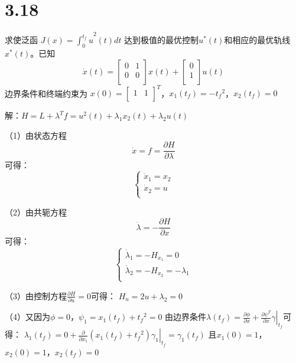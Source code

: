 \documentclass[UTF8]{ctexart}
\begin{document}
\section{3.18}
求使泛函
$J(x)={{\int_{0}^{{{t}_{f}}}{u}}^{2}}\left( t \right)dt$
达到极值的最优控制${{u}^{*}}(t)$和相应的最优轨线${{x}^{*}}(t)$。已知
\[\dot{x}\left( t \right)=\left[ \begin{matrix}
   0 & 1  \\
   0 & 0  \\
\end{matrix} \right]x\left( t \right)+\left[ \begin{matrix}
   0  \\
   1  \\
\end{matrix} \right]u\left( t \right)\]
边界条件和终端约束为
$x\left( 0 \right)={{\left[ \begin{matrix}
   1 & 1  \\
\end{matrix} \right]}^{T}}$，${{x}_{1}}\left( {{t}_{f}} \right)=-{{t}_{f}}^{2}$，${{x}_{2}}\left( {{t}_{f}} \right)=0$

	解：$H=L+{{\lambda }^{T}}f={{u}^{2}}\left( t \right)+{{\lambda }_{1}}x{}_{2}\left( t \right)+{{\lambda }_{2}}u\left( t \right)$

	（1）由状态方程\[\dot{x}=f=\frac{\partial H}{\partial \lambda }\]可得： 
\[\left\{ \begin{array}{*{35}{l}}
   {{{\dot{x}}}_{1}}={{x}_{2}}  \\
   {{{\dot{x}}}_{2}}=u  \\
\end{array} \right.\]

（2）由共轭方程\[\dot{\lambda }=-\frac{\partial H}{\partial x}\]可得：
\[\left\{ \begin{array}{*{35}{l}}
   {{{\dot{\lambda }}}_{1}}=-{{H}_{{{x}_{1}}}}=0  \\
   {{{\dot{\lambda }}}_{2}}=-{{H}_{{{x}_{2}}}}=-{{\lambda }_{1}}  \\
\end{array} \right.\]

	（3）由控制方程$\frac{\partial H}{\partial u}=0$可得：
			${{H}_{u}}=2u+{{\lambda }_{2}}=0$

	（4）又因为$\phi =0$，${{\psi }_{1}}={{x}_{1}}\left( {{t}_{f}} \right)+{{t}_{f}}^{2}=0$
	    由边界条件${{\left. \lambda \left( {{t}_{f}} \right)=\frac{\partial \phi }{\partial x}+\frac{\partial {{\psi }^{T}}}{\partial x}\gamma  \right|}_{{{t}_{f}}}}$可得：
		${{\left. {{\lambda }_{1}}\left( {{t}_{f}} \right)=0+\frac{\partial }{\partial {{x}_{1}}}\left( {{x}_{1}}\left( {{t}_{f}} \right)+{{t}_{f}}^{2} \right){{\gamma }_{1}} \right|}_{{{t}_{f}}}}={{\gamma }_{1}}\left( {{t}_{f}} \right)$
		且${{x}_{1}}\left( 0 \right)=1$，${{x}_{2}}\left( 0 \right)=1$，${{x}_{2}}\left( {{t}_{f}} \right)=0$
\end{document}
